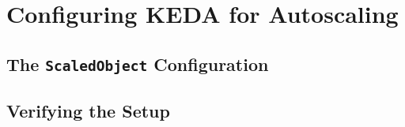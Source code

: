 \section{Configuring KEDA for Autoscaling}
\subsection{The \texttt{ScaledObject} Configuration}
\subsection{Verifying the Setup}
